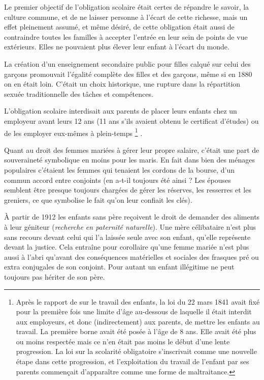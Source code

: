  Le premier objectif de l'obligation scolaire était certes de répandre le savoir, la culture commune, et de ne laisser personne à l'écart de cette richesse, mais un effet pleinement assumé, et même désiré, de cette obligation était aussi de contraindre toutes les familles à accepter l'entrée en leur sein de points de vue extérieurs. Elles ne pouvaient plus élever leur enfant à l'écart du monde. 

 La création d'un enseignement secondaire public pour filles calqué sur celui des garçons promouvait l'égalité complète des filles et des garçons, même si en 1880 on en était loin. C'était un choix historique, une rupture dans la répartition sexuée traditionnelle des tâches et compétences. 

 L'obligation scolaire interdisait aux parents de placer leurs enfants chez un employeur avant leurs 12 ans (11 ans s'ils avaient obtenu le certificat d'études) ou de les employer eux-mêmes à plein-temps%
\footnote{Après le rapport de  sur le travail des enfants, la loi du 22 mars 1841 avait fixé pour la première fois une limite d'âge au-dessous de laquelle il était interdit aux employeurs, et donc (indirectement) aux parents, de mettre les enfants au travail. La première borne avait été posée à l'âge de 8 ans. Elle avait été plus ou moins respectée mais ce n'en était pas moins le début d'une lente progression. La loi sur la scolarité obligatoire s'inscrivait comme une nouvelle étape dans cette progression, et l'exploitation du travail de l'enfant par ses parents commençait d'apparaître comme une forme de maltraitance.}%
. 

 Quant au droit des femmes mariées à gérer leur propre salaire, c'était une part de souveraineté symbolique en moins pour les maris. En fait dans bien des ménages populaires c'étaient les femmes qui tenaient les cordons de la bourse, d'un commun accord entre conjoints (en a-t-il toujours été ainsi ? Les épouses semblent être presque toujours chargées de gérer les réserves, les resserres et les greniers, ce que symbolise le fait qu'on leur confiait les clés).

 À partir de 1912 les enfants sans père reçoivent le droit de demander des aliments à leur géniteur (\emph{recherche en paternité naturelle}). Une mère célibataire n'est plus sans recours devant celui qui l'a laissée seule avec son enfant, qu'elle représente devant la justice. Cela entraîne pour corollaire qu'une femme mariée n'est plus aussi à l'abri qu'avant des conséquences matérielles et sociales des frasques pré ou extra conjugales de son conjoint. Pour autant un enfant illégitime ne peut toujours pas hériter de son père. 


